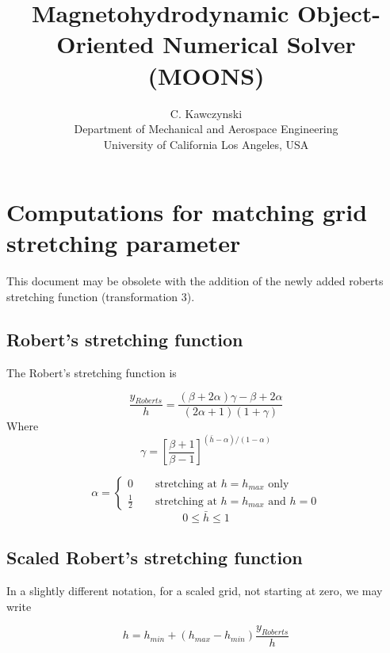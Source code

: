 \documentclass[11pt]{article}
\begin{document}
\doublespacing
\title{Magnetohydrodynamic Object-Oriented Numerical Solver (MOONS)}
\author{C. Kawczynski \\
Department of Mechanical and Aerospace Engineering \\
University of California Los Angeles, USA\\
}
\maketitle

\section{Computations for matching grid stretching parameter}

This document may be obsolete with the addition of the newly added roberts stretching function (transformation 3).

\subsection{Robert's stretching function}
The Robert's stretching function is

\begin{equation}
	\frac{y_{Roberts}}{h} = \frac{(\beta+2\alpha)\gamma - \beta + 2\alpha}{(2\alpha+1)(1+\gamma)}
\end{equation}
Where
\begin{equation}
	\gamma = \left[
	\frac{\beta+1}{\beta-1}
	\right]^{(\bar{h}-\alpha)/(1-\alpha)}
\end{equation}

\begin{equation}
	\alpha =
	\begin{cases}
	0 \qquad \text{stretching at $h=h_{max}$ only}
	\\
	\frac{1}{2} \qquad \text{stretching at $h=h_{max}$ and $h=0$}
	\end{cases}
\end{equation}
\begin{equation}
	0 \le \bar{h} \le 1
\end{equation}


\subsection{Scaled Robert's stretching function}
In a slightly different notation, for a scaled grid, not starting at zero, we may write

\begin{equation}
	h = h_{min} + (h_{max}-h_{min}) \frac{y_{Roberts}}{h}
\end{equation}
\end{document}
